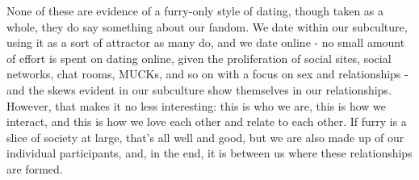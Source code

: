 None of these are evidence of a furry-only style of dating, though taken as a whole, they do say something about our fandom. We date within our subculture, using it as a sort of attractor as many do, and we date online - no small amount of effort is spent on dating online, given the proliferation of social sites, social networks, chat rooms, MUCKs, and so on with a focus on sex and relationships - and the skews evident in our subculture show themselves in our relationships. However, that makes it no less interesting: this is who we are, this is how we interact, and this is how we love each other and relate to each other. If furry is a slice of society at large, that's all well and good, but we are also made up of our individual participants, and, in the end, it is between us where these relationships are formed.
